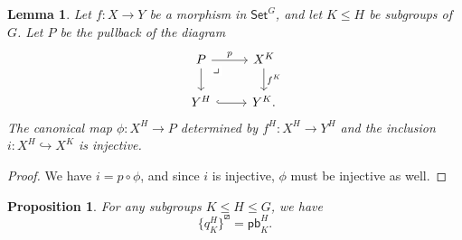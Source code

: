\documentclass{amsart}
\newcommand{\Set}{\mathsf{Set}}
\newcommand{\GSet}{\Set^G}
\newcommand{\rlp}[1]{{#1}^{\boxslash}}
\newcommand{\pb}{\mathsf{pb}}
\numberwithin{equation}{section}
\newtheorem{proposition}[equation]{Proposition}
\newtheorem{lemma}[equation]{Lemma}
\theoremstyle{definition}
\begin{document}
\begin{lemma}
	\label{fixed points to pullback is always injective}
	Let $f \colon X \to Y$ be a morphism in $\GSet$, and let $K \leq H$ be subgroups of $G$. Let $P$ be the pullback of the diagram 
	\[
		\begin{tikzcd}
			P
			\ar[dr, phantom, "\lrcorner" description, very near start]
			\ar[r, "p"]
			\ar[d]
			&
			X^K
			\ar[d, "f^K"]
			\\
			Y^H
			\ar[r, hook]
			&
			Y^K.
		\end{tikzcd}
	\]
	The canonical map $\phi \colon X^H \to P$ determined by $f^H \colon X^H \to Y^H$ and the inclusion $i \colon X^H \hookrightarrow X^K$ is injective. 
\end{lemma}
\begin{proof}
	We have $i = p \circ \phi$, and since $i$ is injective, $\phi$ must be injective as well.
\end{proof}

\begin{proposition}\label{proposition:qHKboxslash}
	For any subgroups $K \leq H \leq G$, we have
	\[
		\rlp{\{q^H_K\}} = \pb_K^H.
	\]
\end{proposition}
\end{document}
